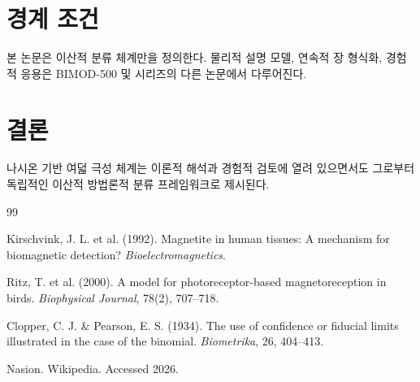 \documentclass[12pt,a4paper]{article}
\begin{document}
\section{경계 조건}

본 논문은 이산적 분류 체계만을 정의한다. 
물리적 설명 모델, 연속적 장 형식화, 경험적 응용은 BIMOD-500 및 시리즈의 다른 논문에서 다루어진다.

\section{결론}

나시온 기반 여덟 극성 체계는 이론적 해석과 경험적 검토에 열려 있으면서도 그로부터 독립적인 이산적 방법론적 분류 프레임워크로 제시된다.

\begin{thebibliography}{99}

Kirschvink, J. L. et al. (1992). Magnetite in human tissues: A mechanism for biomagnetic detection? \textit{Bioelectromagnetics}.

Ritz, T. et al. (2000). A model for photoreceptor-based magnetoreception in birds. \textit{Biophysical Journal}, 78(2), 707–718.

Clopper, C. J. \& Pearson, E. S. (1934). The use of confidence or fiducial limits illustrated in the case of the binomial. \textit{Biometrika}, 26, 404–413.

Nasion. Wikipedia. Accessed 2026.

\end{thebibliography}
\end{document}

